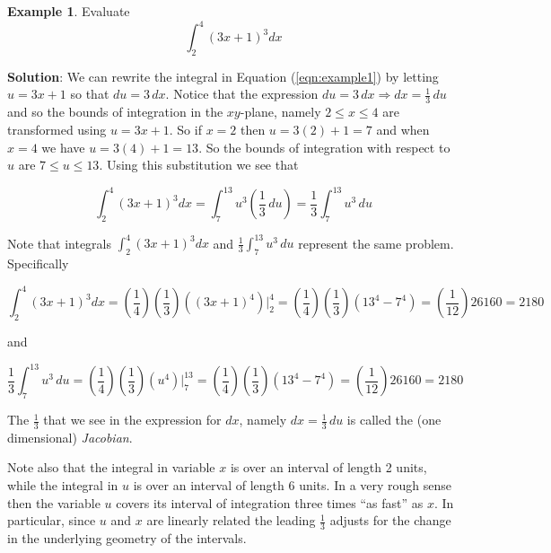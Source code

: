 \documentclass{article}
\theoremstyle{definition}
\newtheorem{example}{Example}[section]
\begin{document}
\begin{example} Evaluate 
\begin{equation}
\int_{2}^{4} (3x + 1)^3  dx
\label{eqn:example1}
\end{equation}

\bigskip
\noindent
{\bf Solution}: We can rewrite the integral in Equation
(\ref{eqn:example1}) by letting $u = 3x + 1$ so that $du = 3 \,
dx$. Notice that the expression $du = 3 \, dx \Rightarrow dx =
\frac{1}{3} \, du$ and so the bounds of integration in the
$xy$-plane, namely $2 \leq x \leq 4$ are transformed using $u =
3x + 1$. So if $x = 2$ then $u = 3(2) + 1 = 7$ and when $x = 4$
we have $u = 3(4) + 1 = 13$. So the bounds of integration with
respect to $u$ are $7 \leq u \leq 13$. Using this substitution we
see that

\bigskip
\begin{equation*}
\int_{2}^{4} \! \! (3x + 1)^3 dx 
= \int_{7}^{13} \!\!\!  u^3 \left (\frac{1}{3} \, du \right )
= \frac{1}{3} \int_{7}^{13} \!\!\!  u^3 \, du
\end{equation*}

\bigskip
{}
\noindent
Note that integrals ${\displaystyle \int_{2}^{4} (3x + 1)^3 dx}$
and ${\displaystyle \frac{1}{3} \int_{7}^{13} \!\!\!  u^3 \, du}$
represent the same problem. Specifically


\bigskip
\begin{equation*}
\int_{2}^{4} \! \! (3x + 1)^3 dx  
=  \left ( \frac{1}{4} \right ) \left ( \frac{1}{3} \right ) \left ( (3x+1)^4 \right ) \Bigg   |_{2}^{4} 
= \left ( \frac{1}{4} \right ) \left ( \frac{1}{3} \right ) \left  ( 13^4 - 7^4 \right ) 
=  \left ( \frac{1}{12} \right ) 26160 
=  2180
\end{equation*}

\bigskip
\noindent
and 

\smallskip
\begin{equation*}
\frac{1}{3} \int_{7}^{13} \!\!\!  u^3 \, du  
=  \left ( \frac{1}{4} \right ) \left ( \frac{1}{3} \right ) \left ( u^4 \right )  \Bigg   |_{7}^{13} 
= \left ( \frac{1}{4} \right ) \left ( \frac{1}{3} \right ) \left (13^4 - 7^4 \right )  
=  \left ( \frac{1}{12} \right ) 26160 
= 2180
\end{equation*}

\bigskip
\noindent
The $\frac{1}{3}$  that we see in the expression 
for $dx$, namely $dx = \frac{1}{3} \, du$ is called the 
(one dimensional) \emph{Jacobian}. 


\bigskip
\noindent
Note also that the integral in variable $x$ is over an interval
of length 2 units, while the integral in $u$ is over an interval
of length 6 units. In a very rough sense then the variable $u$
covers its interval of integration three times “as fast” as
$x$. In particular, since $u$ and $x$ are linearly related the
leading $\frac{1}{3}$ adjusts for the change in the underlying
geometry of the intervals.
\end{example}
\end{document}
